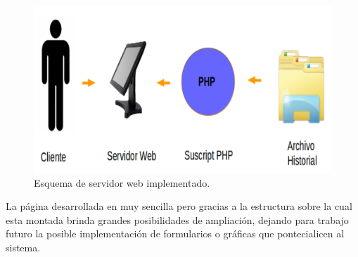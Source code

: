 \begin{figure}[h]
	\centering
	\includegraphics[scale =.3]{./Figures/servidor.png}
	\caption{Esquema de servidor web implementado.}
	\label{fig:servidor}
\end{figure}

La página desarrollada en muy sencilla pero gracias a la estructura sobre la cual esta montada brinda grandes posibilidades de ampliación, dejando para trabajo futuro la posible implementación de formularios o gráficas que pontecialicen al sistema.




